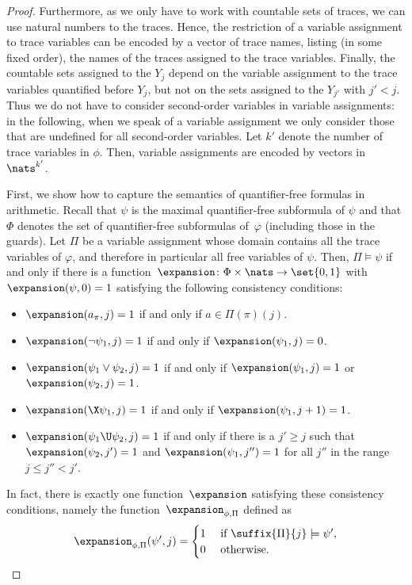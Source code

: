 \begin{proof}
Furthermore, as we only have to work with countable sets of traces, we can use natural numbers to  the traces. Hence, the restriction of a variable assignment to trace variables can be encoded by a vector of trace names, listing (in some fixed order), the names of the traces assigned to the trace variables. 
Finally, the countable sets assigned to the $Y_j$ depend on the variable assignment to the trace variables quantified before $Y_j$, but not on the sets assigned to the $Y_{j'}$ with $j' < j$. Thus we do not have to consider second-order variables in variable assignments: in the following, when we speak of a variable assignment we only consider those that are undefined for all second-order variables. Let $k'$ denote the number of trace variables in $\phi$. Then, variable assignments are encoded by vectors in $\nats^{k'}$.

First, we show how to capture the semantics of quantifier-free formulas in arithmetic.
Recall that $\psi$ is the maximal quantifier-free subformula of $\psi$ and that $\Phi$ denotes the set of quantifier-free subformulas of~$\varphi$ (including those in the guards).
Let $\Pi$ be a variable assignment whose domain contains all the trace variables of $\varphi$, and therefore in particular all free variables of $\psi$.
Then, $\Pi \models \psi$ if and only if there is a function~$\expansion \colon \Phi \times \nats \rightarrow \set{0,1}$ with $\expansion(\psi, 0)=1$ satisfying the following consistency conditions:
\begin{itemize}
	\item $\expansion(a_\pi,j)=1$ if and only if $a \in \Pi(\pi)(j)$.
	\item $\expansion(\neg \psi_1,j)=1$ if and only if  $\expansion(\psi_1,j)=0$.
	\item $\expansion(\psi_1 \vee \psi_2,j)=1$ if and only if $\expansion(\psi_1,j)=1$ or $\expansion(\psi_2,j)=1$.
	\item $\expansion(\X\psi_1,j)=1$ if and only if $\expansion(\psi_1,j+1)=1$.
	\item $\expansion(\psi_1 \U \psi_2,j)=1$ if and only if there is a $j' \ge j$ such that $\expansion(\psi_2,j')=1$ and $\expansion(\psi_1,j'')=1$ for all $j''$ in the range~$j \le j'' < j'$.
\end{itemize}

In fact, there is exactly one function~$\expansion$ satisfying these consistency conditions, namely the function~$\expansion_{\phi,\Pi}$ defined as
\[
\expansion_{\phi,\Pi}(\psi',j) = \begin{cases}
    1 &\text{ if }\suffix{\Pi}{j}\models \psi',\\
    0 &\text{ otherwise.}\\
\end{cases}
\]


\end{proof}
